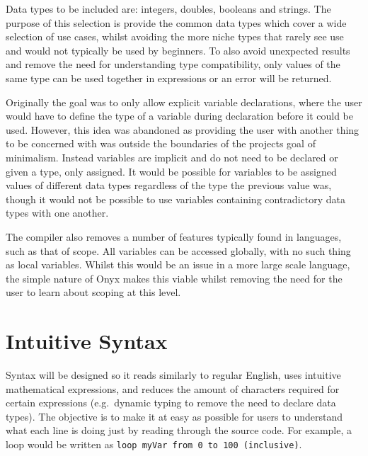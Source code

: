 \documentclass[
]{report}
\begin{document}
Data types to be included are: integers, doubles, booleans and strings.
The purpose of this selection is provide the common data types which
cover a wide selection of use cases, whilst avoiding the more niche
types that rarely see use and would not typically be used by beginners.
To also avoid unexpected results and remove the need for understanding
type compatibility, only values of the same type can be used together in
\glspl{expression} or an error will be returned.

Originally the goal was to only allow explicit variable declarations,
where the user would have to define the type of a variable during
declaration before it could be used. However, this idea was abandoned as
providing the user with another thing to be concerned with was outside
the boundaries of the projects goal of minimalism. Instead variables are
implicit and do not need to be declared or given a type, only assigned.
It would be possible for variables to be assigned values of different
data types regardless of the type the previous value was, though it
would not be possible to use variables containing contradictory data
types with one another.

The compiler also removes a number of features typically found in
languages, such as that of scope. All variables can be accessed
globally, with no such thing as local variables. Whilst this would be an
issue in a more large scale language, the simple nature of Onyx makes
this viable whilst removing the need for the user to learn about scoping
at this level.

\section{Intuitive Syntax}
Syntax will be designed so it reads similarly to regular English, uses
intuitive mathematical \glspl{expression}, and reduces the amount of characters
required for certain \glspl{expression} (e.g.~dynamic typing to remove the need
to declare data types). The objective is to make it at easy as possible
for users to understand what each line is doing just by reading through
the source code. For example, a loop would be written as
\texttt{loop\ myVar\ from\ 0\ to\ 100\ (inclusive)}.
\end{document}
